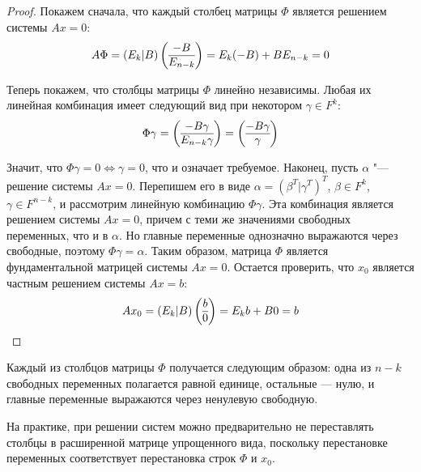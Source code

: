 \begin{proof}
	Покажем сначала, что каждый столбец матрицы $\Phi$ является решением системы $Ax = 0$:
	\[A\Phi = (E_k|B)\left(\begin{array}{@{}c@{}}-B\\\hline E_{n-k}\end{array}\right) = E_k(-B) + BE_{n-k} = 0\]
	
	Теперь покажем, что столбцы матрицы $\Phi$ линейно независимы. Любая их линейная комбинация имеет следующий вид при некотором $\gamma \in F^k$:
	\[\Phi\gamma = \left(\begin{array}{@{}c@{}}-B\gamma\\\hline E_{n - k}\gamma\end{array}\right) = \left(\begin{array}{@{}c@{}}-B\gamma\\\hline \gamma\end{array}\right)\]
	
	Значит, что $\Phi\gamma = 0 \Leftrightarrow \gamma = 0$, что и означает требуемое. Наконец, пусть $\alpha$ "--- решение системы $Ax = 0$. Перепишем его в виде $\alpha = (\beta^T | \gamma^T)^T$, $\beta \in F^k$, $\gamma \in F^{n - k}$, и рассмотрим линейную комбинацию $\Phi\gamma$. Эта комбинация является решением системы $Ax = 0$, причем с теми же значениями свободных переменных, что и в $\alpha$. Но главные переменные однозначно выражаются через свободные, поэтому $\Phi\gamma = \alpha$. Таким образом, матрица $\Phi$ является фундаментальной матрицей системы $Ax = 0$. Остается проверить, что $x_0$ является частным решением системы $Ax = b$:
	\[Ax_0 = (E_k|B)\left(\begin{array}{@{}c@{}}b\\\hline 0\end{array}\right) = E_kb + B0 = b\qedhere\]
\end{proof}

\begin{note}
	Каждый из столбцов матрицы $\Phi$ получается следующим образом: одна из $n - k$ свободных переменных полагается равной единице, остальные --- нулю, и главные переменные выражаются через ненулевую свободную.
\end{note}

\begin{note}
	На практике, при решении систем можно предварительно не переставлять столбцы в расширенной матрице упрощенного вида, поскольку перестановке переменных соответствует перестановка строк $\Phi$ и $x_0$.
\end{note}

